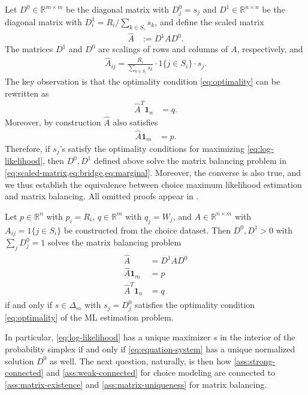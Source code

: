 Let $D^{0}\in\mathbb{R}^{m\times m}$ be the diagonal matrix with
$D_{j}^{0}=s_{j}$ and $D^{1}\in\mathbb{R}^{n\times n}$ be the
diagonal matrix with $D_{i}^{1}={R_i}/{\sum_{k\in S_{i}}s_{k}}$,
and define the scaled matrix
\begin{align}
\label{eq:scaled-matrix}
\hat{A} & :=D^{1}AD^{0}.
\end{align}
The matrices $D^{1}$ and $D^{0}$ are scalings of rows and columns
of $A$, respectively, and
\begin{align*}
    \hat{A}_{ij} = \frac{R_i}{\sum_{k\in S_{i}}s_{k}}\cdot1\{j\in S_{i}\}\cdot s_{j}.
\end{align*}
The key observation is that the optimality condition \eqref{eq:optimality} can be rewritten as
\begin{align}
\label{eq:bridge}
\hat{A}^T \mathbf{1}_n & = q.
\end{align}
Moreover, by construction $\hat{A}$ also satisfies
\begin{align}
\label{eq:marginal}
\hat{A}\mathbf{1}_m & = p.
\end{align}
 Therefore, if $s_j$'s satisfy the optimality conditions for maximizing \eqref{eq:log-likelihood}, then $D^0,D^1$  defined above solve the matrix balancing problem in \cref{eq:scaled-matrix,eq:bridge,eq:marginal}. Moreover, the converse is also true, and we thus establish the equivalence between choice maximum likelihood estimation and matrix balancing. All omitted proofs appear in .
\begin{theorem}
\label{prop:mle-scaling}
Let $p\in\mathbb{R}^{n}$ with $p_{i}=R_i$, $q\in\mathbb{R}^{m}$ with $q_{j}=W_j$, and 
$A\in\mathbb{R}^{n\times m}$
with $A_{ij}=1\{j\in S_{i}\}$ be constructed from the choice dataset. Then  $D^{0},D^{1}>0$ with $\sum_j D_j^0=1$ solves the matrix balancing problem
\begin{align}
\label{eq:equation-system}
\begin{split}
\hat{A} & =D^{1}AD^{0}\\
\hat{A}\mathbf{1}_m & =p\\
\hat{A}^{T} \mathbf{1}_n & =q
\end{split}
\end{align}
if and only if $s \in \Delta_m$ with $s_j=D^0_j$ satisfies the optimality condition \eqref{eq:optimality} of the ML estimation problem.%
\end{theorem}
In particular, \eqref{eq:log-likelihood} has a unique maximizer $s$ in the interior of the probability simplex if and only if \eqref{eq:equation-system} has a unique normalized solution $D^0$ as well. The next question, naturally, is then how \cref{ass:strong-connected} and \cref{ass:weak-connected} for choice modeling are connected to \cref{ass:matrix-existence} and \cref{ass:matrix-uniqueness} for matrix balancing. 
